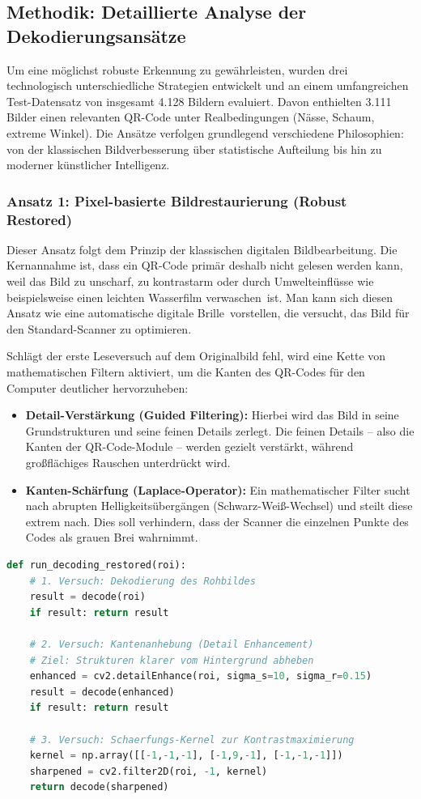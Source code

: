 \documentclass[
    a4paper,        %
    11pt,           %
    ngerman,        %
    parskip=half,   %
    listof=totoc,   %
    bibliography=totoc %
]{scrartcl}
\begin{document}
\subsection{Methodik: Detaillierte Analyse der Dekodierungsansätze}
Um eine möglichst robuste Erkennung zu gewährleisten, wurden drei technologisch unterschiedliche Strategien entwickelt und an einem umfangreichen Test-Datensatz von insgesamt 4.128 Bildern evaluiert. Davon enthielten 3.111 Bilder einen relevanten QR-Code unter Realbedingungen (Nässe, Schaum, extreme Winkel). Die Ansätze verfolgen grundlegend verschiedene Philosophien: von der klassischen Bildverbesserung über statistische Aufteilung bis hin zu moderner künstlicher Intelligenz.

\subsubsection{Ansatz 1: Pixel-basierte Bildrestaurierung (Robust Restored)}
Dieser Ansatz folgt dem Prinzip der klassischen digitalen Bildbearbeitung. Die Kernannahme ist, dass ein QR-Code primär deshalb nicht gelesen werden kann, weil das Bild zu unscharf, zu kontrastarm oder durch Umwelteinflüsse wie beispielsweise einen leichten Wasserfilm \glqq verwaschen\grqq\ ist. Man kann sich diesen Ansatz wie eine automatische \glqq digitale Brille\grqq\ vorstellen, die versucht, das Bild für den Standard-Scanner zu optimieren.

Schlägt der erste Leseversuch auf dem Originalbild fehl, wird eine Kette von mathematischen Filtern aktiviert, um die Kanten des QR-Codes für den Computer deutlicher hervorzuheben:
\begin{itemize}
    \item \textbf{Detail-Verstärkung (Guided Filtering):} Hierbei wird das Bild in seine Grundstrukturen und seine feinen Details zerlegt. Die feinen Details – also die Kanten der QR-Code-Module – werden gezielt verstärkt, während großflächiges Rauschen unterdrückt wird.
    \item \textbf{Kanten-Schärfung (Laplace-Operator):} Ein mathematischer Filter sucht nach abrupten Helligkeitsübergängen (Schwarz-Weiß-Wechsel) und steilt diese extrem nach. Dies soll verhindern, dass der Scanner die einzelnen Punkte des Codes als grauen Brei wahrnimmt.
\end{itemize}

\begin{lstlisting}[language=Python, caption={Iterative Bildverbesserungskette in Ansatz 1}]
def run_decoding_restored(roi):
    # 1. Versuch: Dekodierung des Rohbildes
    result = decode(roi)
    if result: return result
    
    # 2. Versuch: Kantenanhebung (Detail Enhancement)
    # Ziel: Strukturen klarer vom Hintergrund abheben
    enhanced = cv2.detailEnhance(roi, sigma_s=10, sigma_r=0.15)
    result = decode(enhanced)
    if result: return result
    
    # 3. Versuch: Schaerfungs-Kernel zur Kontrastmaximierung
    kernel = np.array([[-1,-1,-1], [-1,9,-1], [-1,-1,-1]])
    sharpened = cv2.filter2D(roi, -1, kernel)
    return decode(sharpened)
\end{lstlisting}
\end{document}
